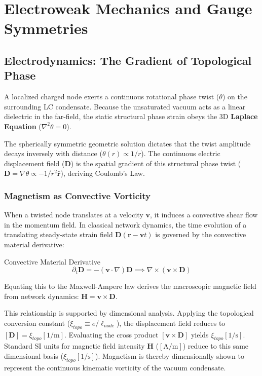 \chapter{Electroweak Mechanics and Gauge Symmetries}
\label{ch:electroweak}

\section{Electrodynamics: The Gradient of Topological Phase}
A localized charged node exerts a continuous rotational phase twist ($\theta$) on the surrounding LC condensate. Because the unsaturated vacuum acts as a linear dielectric in the far-field, the static structural phase strain obeys the 3D \textbf{Laplace Equation} ($\nabla^2 \theta = 0$).

The spherically symmetric geometric solution dictates that the twist amplitude decays inversely with distance ($\theta(r) \propto 1/r$). The continuous electric displacement field ($\mathbf{D}$) is the spatial gradient of this structural phase twist ($\mathbf{D} = \nabla\theta \propto -1/r^2 \mathbf{\hat{r}}$), deriving Coulomb's Law.

\subsection{Magnetism as Convective Vorticity}
When a twisted node translates at a velocity $\mathbf{v}$, it induces a convective shear flow in the momentum field. In classical network dynamics, the time evolution of a translating steady-state strain field $\mathbf{D}(\mathbf{r} - \mathbf{v}t)$ is governed by the convective material derivative:
\begin{resultbox}{Convective Material Derivative}
\begin{equation}
    \partial_t \mathbf{D} = -(\mathbf{v} \cdot \nabla)\mathbf{D} \implies \nabla \times (\mathbf{v} \times \mathbf{D})
\end{equation}
\end{resultbox}
Equating this to the Maxwell-Ampere law derives the macroscopic magnetic field from network dynamics: $\mathbf{H} = \mathbf{v} \times \mathbf{D}$.

This relationship is supported by dimensional analysis. Applying the topological conversion constant ($\xi_{topo} \equiv e/\ell_{node}$), the displacement field reduces to $[\mathbf{D}] = \xi_{topo}[1/\text{m}]$. Evaluating the cross product $[\mathbf{v} \times \mathbf{D}]$ yields $\xi_{topo}[1/\text{s}]$. Standard SI units for magnetic field intensity $\mathbf{H}$ ($[\text{A/m}]$) reduce to this same dimensional basis ($\xi_{topo}[1/\text{s}]$). Magnetism is thereby dimensionally shown to represent the continuous kinematic vorticity of the vacuum condensate.

